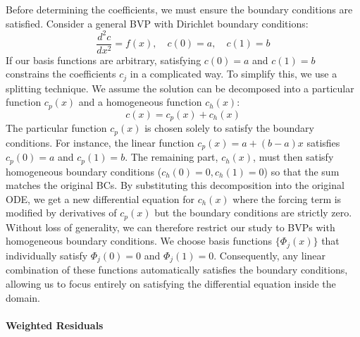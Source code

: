 Before determining the coefficients, we must ensure the boundary conditions are satisfied. Consider a general BVP with Dirichlet boundary conditions:
\begin{equation}
    \frac{d^2c}{dx^2} = f(x), \quad c(0) = a, \quad c(1) = b
    \label{eq:bvp-dirichlet}
\end{equation}
If our basis functions are arbitrary, satisfying $c(0)=a$ and $c(1)=b$ constrains the coefficients $c_j$ in a complicated way. To simplify this, we use a splitting technique. We assume the solution can be decomposed into a particular function $c_p(x)$ and a homogeneous function $c_h(x)$:
\begin{equation}
    c(x) = c_p(x) + c_h(x)
\end{equation}
The particular function $c_p(x)$ is chosen solely to satisfy the boundary conditions. For instance, the linear function $c_p(x) = a + (b-a)x$ satisfies $c_p(0)=a$ and $c_p(1)=b$. The remaining part, $c_h(x)$, must then satisfy homogeneous boundary conditions ($c_h(0)=0, c_h(1)=0$) so that the sum matches the original BCs. By substituting this decomposition into the original ODE, we get a new differential equation for $c_h(x)$ where the forcing term is modified by derivatives of $c_p(x)$ but the boundary conditions are strictly zero. Without loss of generality, we can therefore restrict our study to BVPs with homogeneous boundary conditions. We choose basis functions $\{\Phi_j(x)\}$ that individually satisfy $\Phi_j(0) = 0$ and $\Phi_j(1) = 0$. Consequently, any linear combination of these functions automatically satisfies the boundary conditions, allowing us to focus entirely on satisfying the differential equation inside the domain.

\paragraph*{Weighted Residuals}

